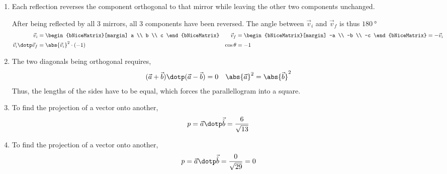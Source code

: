 \begin{enumerate}
      \item Each reflection reverses the component orthogonal to that mirror while
            leaving the other two components unchanged. \par
            After being reflected by all 3 mirrors, all 3 components have been reversed.
            The angle between $ \vec{v}_i $ and $ \vec{v}_f $ is thus
            $ \SI{180}{\degree} $
            \begin{align}
                  \vec{v}_i                 & = \begin{bNiceMatrix}[margin]
                                                      a \\ b \\ c
                                                \end{bNiceMatrix}  &
                  \vec{v}_f                 & = \begin{bNiceMatrix}[margin]
                                                      -a \\ -b \\ -c
                                                \end{bNiceMatrix} = -\vec{v}_i \\
                  \vec{v}_i \dotp \vec{v}_f & = \abs{\vec{v}_i}^2 \cdot (-1) &
                  \cos \theta               & = -1
            \end{align}

      \item The two diagonals being orthogonal requires,
            \begin{align}
                  (\vec{a} + \vec{b}) \dotp (\vec{a} - \vec{b}) & = 0               &
                  \abs{\vec{a}}^2                               & = \abs{\vec{b}}^2
            \end{align}
            Thus, the lengths of the sides have to be equal, which forces the
            parallellogram into a square.

      \item To find the projection of a vector onto another,
            \begin{align}
                  p & = \vec{a} \dotp \vec{\hat{b}} = \frac{6}{\sqrt{13}}
            \end{align}

      \item To find the projection of a vector onto another,
            \begin{align}
                  p & = \vec{a} \dotp \vec{\hat{b}} = \frac{0}{\sqrt{29}} = 0
            \end{align}


\end{enumerate}
